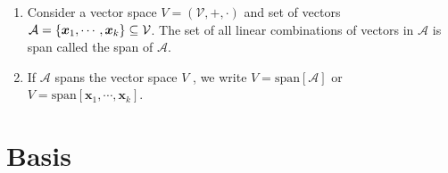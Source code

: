 \begin{enumerate}
    \item
    \begin{definition}[Span]
        Consider a vector space $V = (\mathcal{V}, +, \cdot)$ and set of vectors $\mathcal{A} = \left\{\bm{x}_1, \cdots , \bm{x}_k\right\} \subseteq \mathcal{V}$.
        The set of all linear combinations of vectors in $\mathcal{A}$ is span called the span of $\mathcal{A}$.
        \hfill \cite{mfml/book/mml/Deisenroth-Faisal-Ong}
    \end{definition}

    \item If $\mathcal{A}$ spans the vector space $V$ , we write $V = \text{span}[\mathcal{A}]$ or $V = \text{span}[\bm{x}_1, \cdots , \bm{x}_k]$.
    \hfill \cite{mfml/book/mml/Deisenroth-Faisal-Ong}
\end{enumerate}





\section{Basis}

